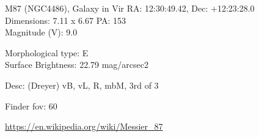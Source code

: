 \begin{block}{M87 (NGC4486), Galaxy in Vir}
    RA: 12:30:49.42, Dec: +12:23:28.0 \\ 
    Dimensions: 7.11 x 6.67 PA: 153 \\ 
    Magnitude (V): 9.0

    Morphological type: E \\ 
    Surface Brightness: 22.79 mag/arcsec2 

    Desc: (Dreyer) vB, vL, R, mbM, 3rd of 3 

    Finder fov: 60 

    \url{https://en.wikipedia.org/wiki/Messier_87} 
\end{block}